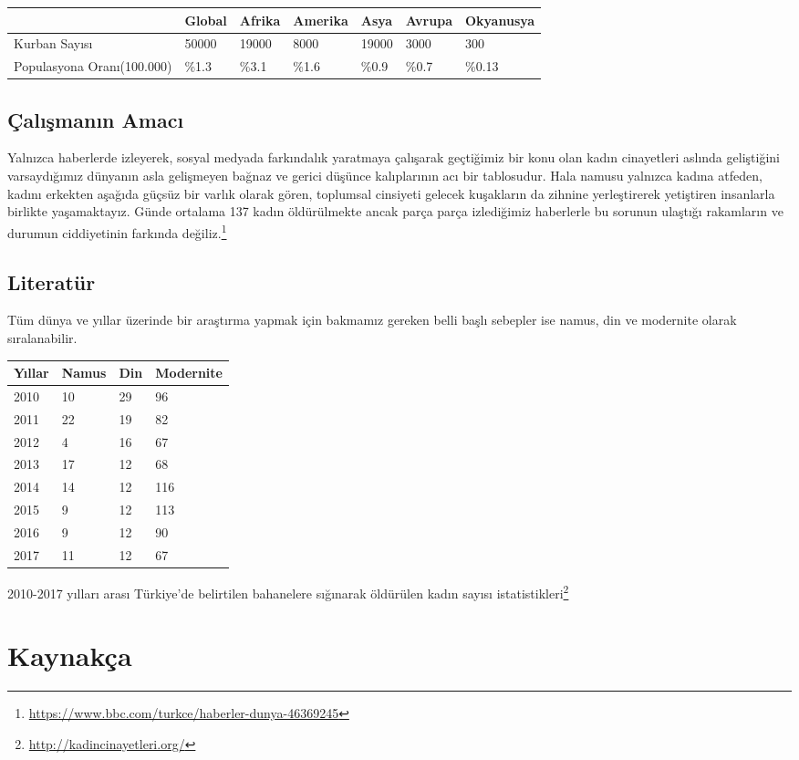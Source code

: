 \documentclass[
  12pt,
]{article}
\newlength{\cslhangindent}
\newlength{\cslentryspacingunit} %
\newenvironment{CSLReferences}[2] %
 {%
  \setlength{\parindent}{0pt}
  \ifodd #1
  \let\oldpar\par
  \def\par{\hangindent=\cslhangindent\oldpar}
  \fi
  \setlength{\parskip}{#2\cslentryspacingunit}
 }%
 {}
\begin{document}
\begin{longtable}[]{@{}lllllll@{}}
\toprule()
& Global & Afrika & Amerika & Asya & Avrupa & Okyanusya \\
\midrule()
\endhead
Kurban Sayısı & 50000 & 19000 & 8000 & 19000 & 3000 & 300 \\
Populasyona Oranı(100.000) & \%1.3 & \%3.1 & \%1.6 & \%0.9 & \%0.7 & \%0.13 \\
\bottomrule()
\end{longtable}

\hypertarget{uxe7alux131ux15fmanux131n-amacux131}{%
\subsection{Çalışmanın Amacı}\label{uxe7alux131ux15fmanux131n-amacux131}}

Yalnızca haberlerde izleyerek, sosyal medyada farkındalık yaratmaya çalışarak geçtiğimiz bir konu olan kadın cinayetleri aslında geliştiğini varsaydığımız dünyanın asla gelişmeyen bağnaz ve gerici düşünce kalıplarının acı bir tablosudur. Hala namusu yalnızca kadına atfeden, kadını erkekten aşağıda güçsüz bir varlık olarak gören, toplumsal cinsiyeti gelecek kuşakların da zihnine yerleştirerek yetiştiren insanlarla birlikte yaşamaktayız. Günde ortalama 137 kadın öldürülmekte ancak parça parça izlediğimiz haberlerle bu sorunun ulaştığı rakamların ve durumun ciddiyetinin farkında değiliz.\footnote{\url{https://www.bbc.com/turkce/haberler-dunya-46369245}}

\hypertarget{literatuxfcr}{%
\subsection{Literatür}\label{literatuxfcr}}

Tüm dünya ve yıllar üzerinde bir araştırma yapmak için bakmamız gereken belli başlı sebepler ise namus, din ve modernite olarak sıralanabilir.

\begin{longtable}[]{@{}llll@{}}
\toprule()
Yıllar & Namus & Din & Modernite \\
\midrule()
\endhead
2010 & 10 & 29 & 96 \\
2011 & 22 & 19 & 82 \\
2012 & 4 & 16 & 67 \\
2013 & 17 & 12 & 68 \\
2014 & 14 & 12 & 116 \\
2015 & 9 & 12 & 113 \\
2016 & 9 & 12 & 90 \\
2017 & 11 & 12 & 67 \\
\bottomrule()
\end{longtable}

2010-2017 yılları arası Türkiye'de belirtilen bahanelere sığınarak öldürülen kadın sayısı istatistikleri\footnote{\url{http://kadincinayetleri.org/}}

\newpage

\hypertarget{references}{%
\section{Kaynakça}\label{references}}

\hypertarget{refs}{}
\begin{CSLReferences}{0}{0}
\end{CSLReferences}
\end{document}
